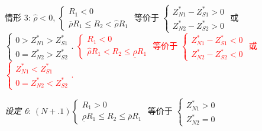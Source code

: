\documentclass[10.0pt]{article}
\newcommand{\hhred}{\textcolor{red}}
\begin{document}
情形 3: $ {\hat \rho} < 0 $, $ \left\{ \begin{matrix} R_1 < 0 \\ \overline{\rho} R_1 \leqslant R_2 < {\hat \rho} R_1 \end{matrix} \right. $ 等价于 $ \left\{ \begin{matrix} Z_{N 1}^* - Z_{S 1}^* > 0 \\ Z_{N 2}^* - Z_{S 2}^* > 0 \end{matrix} \right. $ 或 $ \left\{ \begin{matrix} 0 > Z_{N 1}^* > Z_{S 1}^* \\ 0 = Z_{N 2}^* > Z_{S 2}^* \end{matrix} \right. $.
\hhred{$ \left\{ \begin{matrix} R_1 < 0 \\ {\hat \rho} R_1 < R_2 \leqslant \underline{\rho} R_1 \end{matrix} \right. $ 等价于 $ \left\{ \begin{matrix} Z_{N 1}^* - Z_{S 1}^* < 0 \\ Z_{N 2}^* - Z_{S 2}^* < 0 \end{matrix} \right. $ 或 $ \left\{ \begin{matrix} Z_{N 1}^* < Z_{S 1}^* \\ 0 = Z_{N 2}^* < Z_{S 2}^* \end{matrix} \right. $.}

{\it 设定 6}: $ (N+.1) \left\{ \begin{matrix} R_1 > 0 \\ \underline{\rho} R_1 \leqslant R_2 \leqslant \overline{\rho} R_1 \end{matrix} \right. $ 等价于 $ \left\{ \begin{matrix} Z_{N 1}^* > 0 \\ Z_{N 2}^* = 0 \end{matrix} \right. $
\end{document}
